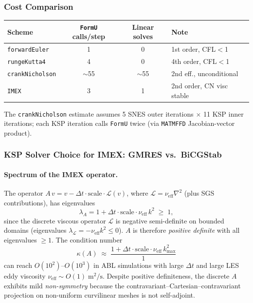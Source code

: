 \documentclass[12pt,a4paper]{article}
\newcommand{\cL}{\mathcal{L}}
\newcommand{\dt}{\Delta t}
\begin{document}
	\subsubsection{Cost Comparison}
	
	\begin{center}
		\begin{tabular}{lccl}
			\toprule
			Scheme & \texttt{FormU} calls/step & Linear solves & Note \\
			\midrule
			\texttt{forwardEuler}  & 1 & 0 & 1st order, CFL$<$1 \\
			\texttt{rungeKutta4}   & 4 & 0 & 4th order, CFL$<$1 \\
			\texttt{crankNicholson} & $\sim$55 & $\sim$55 & 2nd eff., unconditional \\
			\texttt{IMEX}          & 3 & 1 & 2nd order, CN visc stable \\
			\bottomrule
		\end{tabular}
	\end{center}
	
	The \texttt{crankNicholson} estimate assumes 5 SNES outer iterations
	$\times$ 11 KSP inner iterations; each KSP iteration calls
	\texttt{FormU} twice (via \texttt{MATMFFD} Jacobian-vector product).

	\subsubsection{KSP Solver Choice for IMEX: GMRES vs.\ BiCGStab}
	\label{sec:ksp-theory}

	\paragraph{Spectrum of the IMEX operator.}
	The operator $A\,v = v - \dt\cdot\text{scale}\cdot\cL(v)$, where
	$\cL = \nu_\text{eff}\nabla^2$ (plus SGS contributions), has eigenvalues
	\begin{equation}
		\lambda_A = 1 + \dt\cdot\text{scale}\cdot\nu_\text{eff}\,k^2 \;\geq\; 1,
	\end{equation}
	since the discrete viscous operator $\cL$ is negative semi-definite on
	bounded domains (eigenvalues $\lambda_\cL = -\nu_\text{eff}k^2 \leq 0$).
	$A$ is therefore \emph{positive definite} with all eigenvalues $\geq 1$.
	The condition number
	\begin{equation}
		\kappa(A) \;\approx\;
		\frac{1 + \dt\cdot\text{scale}\cdot\nu_\text{eff}\,k_{\max}^2}{1}
	\end{equation}
	can reach $O(10^2)$--$O(10^3)$ in ABL simulations with large $\dt$ and
	large LES eddy viscosity $\nu_\text{eff} \sim O(1)\;\text{m}^2/\text{s}$.
	Despite positive definiteness, the discrete $A$ exhibits mild
	\emph{non-symmetry} because the contravariant--Cartesian--contravariant
	projection on non-uniform curvilinear meshes is not self-adjoint.
\end{document}
